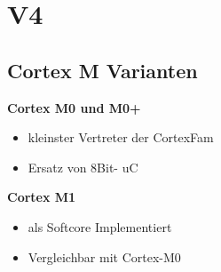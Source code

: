 \section{V4}
\subsection{Cortex M Varianten}
\begin{multicols}{2}
    \textbf{Cortex M0 und M0+}
    \begin{itemize}
        \item kleinster Vertreter der CortexFam
        \item Ersatz von 8Bit- uC
    \end{itemize}                     
    \textbf{Cortex M1}
    \begin{itemize}
        \item als Softcore Implementiert
        \item Vergleichbar mit Cortex-M0
    \end{itemize}
\end{multicols}

